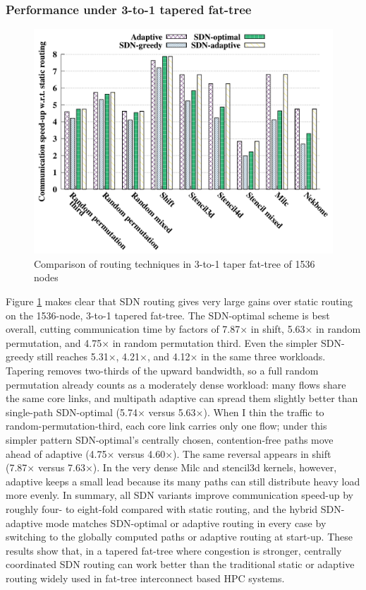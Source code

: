 \subsubsection{Performance under 3-to-1 tapered fat-tree}
\begin{figure}[h]
  \centering
  \includegraphics[width=\columnwidth]{./figs_4/routing_taper.pdf}
  \caption{Comparison of routing techniques in 3-to-1 taper fat-tree of 1536 nodes}
  \label{fig:routing_taper}
\end{figure}
Figure \ref{fig:routing_taper} makes clear that SDN routing gives very large gains over static routing on the 1536-node, 3-to-1 tapered fat-tree. The SDN-optimal scheme is best overall, cutting communication time by factors of 7.87× in shift, 5.63× in random permutation, and 4.75× in random permutation third. Even the simpler SDN-greedy still reaches 5.31×, 4.21×, and 4.12× in the same three workloads. 
Tapering removes two-thirds of the upward bandwidth, so a full random permutation already counts as a moderately dense workload: many flows share the same core links, and multipath adaptive can spread them slightly better than single-path SDN-optimal (5.74× versus 5.63×). When I thin the traffic to random-permutation-third, each core link carries only one flow; under this simpler pattern SDN-optimal’s centrally chosen, contention-free paths move ahead of adaptive (4.75× versus 4.60×). The same reversal appears in shift (7.87× versus 7.63×). In the very dense Milc and stencil3d kernels, however, adaptive keeps a small lead because its many paths can still distribute heavy load more evenly.
In summary, all SDN variants improve communication speed-up by roughly four- to eight-fold compared with static routing, and the hybrid SDN-adaptive mode matches SDN-optimal or adaptive routing in every case by switching to the globally computed paths or adaptive routing at start-up. These results show that, in a tapered fat-tree where congestion is stronger, centrally coordinated SDN routing can work better than the traditional static or adaptive routing widely used in fat-tree interconnect based HPC systems.
